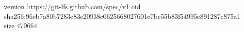 version https://git-lfs.github.com/spec/v1
oid sha256:96eb7a80b7283e83e20938c0625668027601e7bc55b83f54995c891287c875a1
size 470664
